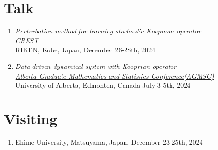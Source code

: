 \documentclass[margin]{res}
\begin{document}
\begin{resume}
\begin{enumerate}
\end{enumerate}


\section{Talk}
\begin{enumerate}
    \item {\sl Perturbation method for learning stochastic Koopman operator} \\
    {\sl CREST} \\
    RIKEN, Kobe, Japan, December 26-28th, 2024

    \item {\sl Data-driven dynamical system with Koopman operator} \\    \href{https://docs.google.com/document/d/1oWIKgW8W_qmmOJkUmXaJiKEmhW-mByOP0N44jT0jp18/edit#heading=h.dkxccm7x4lvd}{\sl Alberta Graduate Mathematics and Statistics Conference(AGMSC)} \\
    University of Alberta, Edmonton, Canada July 3-5th, 2024
\end{enumerate}



\section{Visiting}
\begin{enumerate}
    \item Ehime University, Matsuyama, Japan, December 23-25th, 2024
\end{enumerate}







\end{resume}
\(\)
\end{document}
